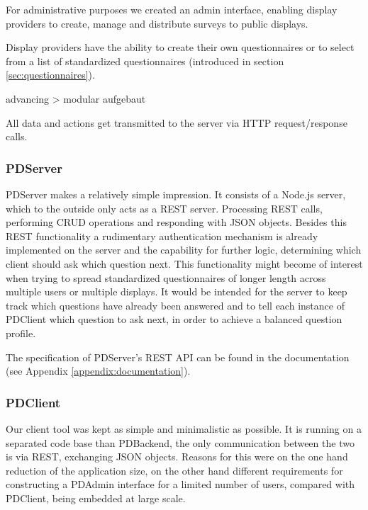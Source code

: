 		For administrative purposes we created an admin interface, enabling display providers to create, manage and distribute surveys to public displays. 

		Display providers have the ability to create their own questionnaires or to select from a list of standardized questionnaires (introduced in section \ref{sec:questionnaires}).





			advancing > modular aufgebaut


		All data and actions get transmitted to the server via HTTP request/response calls.

	\subsubsection{PDServer}

		PDServer makes a relatively simple impression. It consists of a Node.js server, which to the outside only acts as a REST server. Processing REST calls, performing CRUD operations and responding with JSON objects. Besides this REST functionality a rudimentary authentication mechanism is already implemented on the server and the capability for further logic, determining which client should ask which question next. This functionality might become of interest when trying to spread standardized questionnaires of longer length across multiple users or multiple displays. It would be intended for the server to keep track which questions have already been answered and to tell each instance of PDClient which question to ask next, in order to achieve a balanced question profile.


		The specification of PDServer's REST API can be found in the documentation (see Appendix \ref{appendix:documentation}).



	\subsubsection{PDClient}

		Our client tool was kept as simple and minimalistic as possible. It is running on a separated code base than PDBackend, the only communication between the two is via REST, exchanging JSON objects. Reasons for this were on the one hand reduction of the application size, on the other hand different requirements for constructing a PDAdmin interface for a limited number of users, compared with PDClient, being embedded at large scale.

